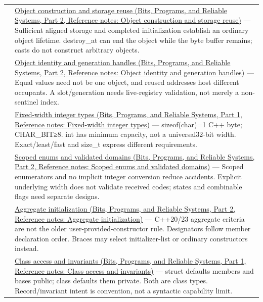 {\begin{longtable}[]{@{}
  >{\raggedright\arraybackslash}p{}
  >{\raggedright\arraybackslash}p{}@{}}
106 & \href{../01-Bits-Programs-and-Reliable-Systems-P02/main.pdf\#nameddest=appendix-a82f9c438857}{Object construction and storage reuse (Bits, Programs, and Reliable Systems, Part 2, Reference notes: Object construction and storage reuse)} --- Sufficient aligned storage and completed initialization establish an ordinary object lifetime. destroy\_at can end the object while the byte buffer remains; casts do not construct arbitrary objects. \\
107 & \href{../01-Bits-Programs-and-Reliable-Systems-P02/main.pdf\#nameddest=appendix-f1581457d322}{Object identity and generation handles (Bits, Programs, and Reliable Systems, Part 2, Reference notes: Object identity and generation handles)} --- Equal values need not be one object, and reused addresses host different occupants. A slot/generation needs live-registry validation, not merely a non-sentinel index. \\
108 & \href{../01-Bits-Programs-and-Reliable-Systems-P01/main.pdf\#nameddest=appendix-cc04044b5782}{Fixed-width integer types (Bits, Programs, and Reliable Systems, Part 1, Reference notes: Fixed-width integer types)} --- sizeof(char)=1 C++ byte; CHAR\_BIT≥8. int has minimum capacity, not a universal32-bit width. Exact/least/fast and size\_t express different requirements. \\
109 & \href{../01-Bits-Programs-and-Reliable-Systems-P02/main.pdf\#nameddest=appendix-23640fcee147}{Scoped enums and validated domains (Bits, Programs, and Reliable Systems, Part 2, Reference notes: Scoped enums and validated domains)} --- Scoped enumerators and no implicit integer conversion reduce accidents. Explicit underlying width does not validate received codes; states and combinable flags need separate designs. \\
110 & \href{../01-Bits-Programs-and-Reliable-Systems-P02/main.pdf\#nameddest=appendix-b7174c179542}{Aggregate initialization (Bits, Programs, and Reliable Systems, Part 2, Reference notes: Aggregate initialization)} --- C++20/23 aggregate criteria are not the older user-provided-constructor rule. Designators follow member declaration order. Braces may select initializer-list or ordinary constructors instead. \\
111 & \href{../01-Bits-Programs-and-Reliable-Systems-P01/main.pdf\#nameddest=appendix-8e5214819615}{Class access and invariants (Bits, Programs, and Reliable Systems, Part 1, Reference notes: Class access and invariants)} --- struct defaults members and bases public; class defaults them private. Both are class types. Record/invariant intent is convention, not a syntactic capability limit. \\

\end{longtable}}

